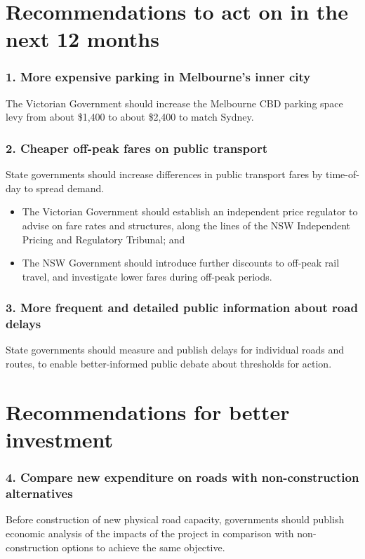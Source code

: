 \documentclass{grattan}
\begin{document}
\begin{recommendations}

\section*{Recommendations to act on in the next 12 months}

\subsubsection{1. More expensive parking in Melbourne’s inner city}
The Victorian Government should increase the Melbourne CBD parking space levy from about \$1,400 to about \$2,400 to match Sydney.
\subsubsection{2. Cheaper off-peak fares on public transport}
State governments should increase differences in public transport fares by time-of-day to spread demand.
\begin{itemize}
\item The Victorian Government should establish an independent price regulator to advise on fare rates and structures, along the lines of the NSW Independent Pricing and Regulatory Tribunal; and
\item The NSW Government should introduce further discounts to off-peak rail travel, and investigate lower fares during off-peak periods.
\end{itemize}

\subsubsection{3. More frequent and detailed public information about road delays}
State governments should measure and publish delays for individual roads and routes, to enable better-informed public debate about thresholds for action.
\null\vfill\null
\columnbreak
\section*{Recommendations for better investment}
\subsubsection{4. Compare new expenditure on roads with non-construction alternatives}
Before construction of new physical road capacity, governments should publish economic analysis of the impacts of the project in comparison with non-construction options to achieve the same objective.



\end{recommendations}
\end{document}
